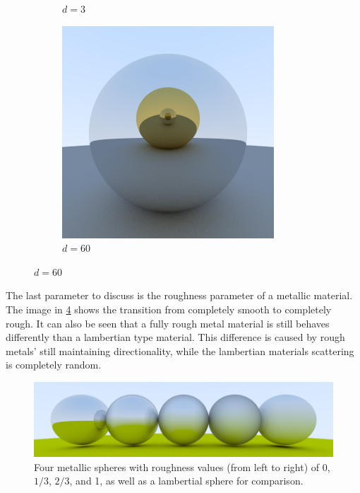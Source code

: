 \documentclass[10pt]{IEEEtran}
\begin{document}
\begin{figure}
\begin{subfigure}[b]{0.2\textwidth}
        \caption{$d=3$}
        \label{fig:recursion d equals 3}
    \end{subfigure}
    \begin{subfigure}[b]{0.2\textwidth}
        \centering
        \includegraphics[width=\textwidth]{images/recursiveDepth/60.png}
        \caption{$d=60$}
        \label{fig:recursion d equals 60}
    \end{subfigure}
\end{figure}

The last parameter to discuss is the roughness parameter of a metallic material. The image in
\cref{fig:roughness} shows the transition from completely smooth to completely rough. It can also be
seen that a fully rough metal material is still behaves differently than a lambertian type material.
This difference is caused by rough metals' still maintaining directionality, while the lambertian
materials scattering is completely random.

\begin{figure}

    \caption{ Four metallic spheres with roughness values (from left to right) of 0, $1/3$, $2/3$,
        and 1, as well as a lambertial sphere for comparison.}

    \label{fig:roughness}
    \includegraphics[width=\columnwidth]{images/roughness.png}
\end{figure}
\end{document}
